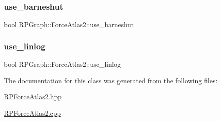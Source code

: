 \subsubsection{\texorpdfstring{use\+\_\+barneshut}{use\_barneshut}}
{\footnotesize\ttfamily bool R\+P\+Graph\+::\+Force\+Atlas2\+::use\+\_\+barneshut}

\mbox{\label{classRPGraph_1_1ForceAtlas2_a5f1e78d982b10646f7d79fef5cc49ea7}} 
\subsubsection{\texorpdfstring{use\+\_\+linlog}{use\_linlog}}
{\footnotesize\ttfamily bool R\+P\+Graph\+::\+Force\+Atlas2\+::use\+\_\+linlog}



The documentation for this class was generated from the following files\+:\begin{DoxyCompactItemize}
\item 
\mbox{\hyperlink{RPForceAtlas2_8hpp}{R\+P\+Force\+Atlas2.\+hpp}}\item 
\mbox{\hyperlink{RPForceAtlas2_8cpp}{R\+P\+Force\+Atlas2.\+cpp}}\end{DoxyCompactItemize}
